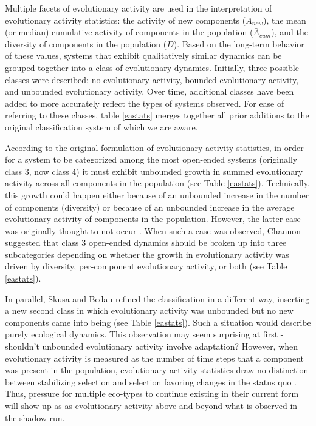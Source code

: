 \documentclass[letterpaper]{article}
\begin{document}
Multiple facets of evolutionary activity are used in the interpretation of evolutionary activity statistics: the activity of new components ($A_{new}$), the mean (or median) cumulative activity of components in the population ($\bar{A}_{cum}$), and the diversity of components in the population ($D$). Based on the long-term behavior of these values, systems that exhibit qualitatively similar dynamics can be grouped together into a class of evolutionary dynamics. Initially, three possible classes were described: no evolutionary activity, bounded evolutionary activity, and unbounded evolutionary activity. Over time, additional classes have been added to more accurately reflect the types of systems observed. For ease of referring to these classes, table \ref{eastats} merges together all prior additions to the original classification system of which we are aware.



According to the original formulation of evolutionary activity statistics, in order for a system to be categorized among the most open-ended systems (originally class 3, now class 4) it must exhibit unbounded growth in summed evolutionary activity across all components in the population \citep{bedau_comparison_1997} (see Table \ref{eastats}). Technically, this growth could happen either because of an unbounded increase in the number of components (diversity) or because of an unbounded increase in the average evolutionary activity of components in the population. However, the latter case was originally thought to not occur \citep{bedau_classification_1998}. When such a case was observed, Channon suggested that class 3 open-ended dynamics should be broken up into three subcategories depending on whether the growth in evolutionary activity was driven by diversity, per-component evolutionary activity, or both \citep{channon_passing_2001} (see Table \ref{eastats}). 

In parallel, Skusa and Bedau refined the classification in a different way, inserting a new second class in which evolutionary activity was unbounded but no new components came into being \citep{skusa_towards_2003} (see Table \ref{eastats}). Such a situation would describe purely ecological dynamics. This observation may seem surprising at first - shouldn't unbounded evolutionary activity involve adaptation? However, when evolutionary activity is measured as the number of time steps that a component was present in the population, evolutionary activity statistics draw no distinction between stabilizing selection and selection favoring changes in the status quo \citep{channon_improving_2003}. Thus, pressure for multiple eco-types to continue existing in their current form will show up as as evolutionary activity above and beyond what is observed in the shadow run.  
\end{document}
